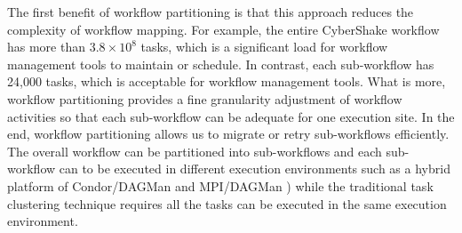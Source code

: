 The first benefit of workflow partitioning is that this approach reduces the complexity of workflow mapping. For example, the entire CyberShake workflow has more than $3.8\times 10^8$ tasks, which is a significant load for workflow management tools to maintain or schedule. In contrast, each sub-workflow has 24,000 tasks, which is acceptable for workflow management tools. What is more, workflow partitioning provides a fine granularity adjustment of workflow activities so that each sub-workflow can be adequate for one execution site. In the end, workflow partitioning allows us to migrate or retry sub-workflows efficiently. The overall workflow can be partitioned into sub-workflows and each sub-workflow can to be executed in different execution environments such as a hybrid platform of Condor/DAGMan \cite{DAGMan} and MPI/DAGMan \cite{Rynge2012}) while the traditional task clustering technique requires all the tasks can be executed in the same execution environment. 



 


